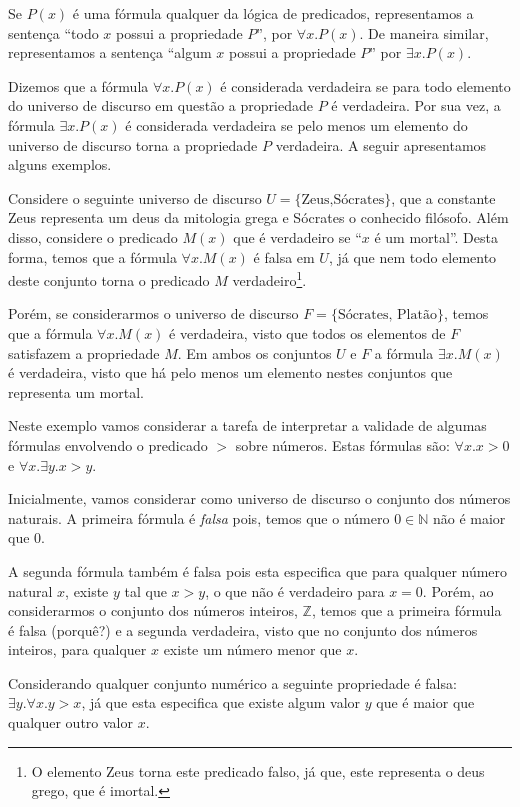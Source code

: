 Se $P(x)$ é uma fórmula qualquer da lógica de predicados,
representamos a sentença ``todo $x$ possui a propriedade $P$'', por
$\forall x.P(x)$. De maneira similar, representamos a sentença ``algum
$x$ possui a propriedade $P$'' por $\exists x.P(x)$.

Dizemos que a fórmula $\forall x.P(x)$ é considerada verdadeira se para todo
elemento do universo de discurso em questão a propriedade $P$ é
verdadeira. Por sua vez, a fórmula $\exists x.P(x)$ é considerada
verdadeira se pelo menos um elemento do universo de discurso torna a
propriedade $P$ verdadeira. A seguir apresentamos alguns exemplos.

\begin{Example}
Considere o seguinte universo de discurso $U = \{\text{Zeus,Sócrates}\}$,
que a constante Zeus representa um deus da mitologia grega e Sócrates
o conhecido filósofo. Além disso, considere o predicado $M(x)$ que é
verdadeiro se ``$x$ é um mortal''. Desta forma, temos que a fórmula
$\forall x. M(x)$ é falsa em $U$, já que nem todo elemento deste
conjunto torna o predicado $M$ verdadeiro\footnote{O elemento Zeus torna
este predicado falso, já que, este representa o deus grego, que é
imortal.}.

Porém, se considerarmos o universo de discurso $F = \{\text{Sócrates, Platão}\}$, temos que
a fórmula $\forall x. M(x)$ é verdadeira, visto que todos os elementos
de $F$ satisfazem a propriedade $M$. Em ambos os conjuntos $U$ e $F$ a
fórmula $\exists x. M(x)$ é verdadeira, visto que há pelo menos um
elemento nestes conjuntos que representa um mortal.
\end{Example}

\begin{Example}
Neste exemplo vamos considerar a tarefa de interpretar a validade de
algumas fórmulas envolvendo o predicado $>$ sobre
números. Estas fórmulas são: $\forall x. x > 0$ e $\forall x. \exists
y. x > y$.

Inicialmente, vamos considerar como universo de discurso o
conjunto dos números naturais. A primeira fórmula é \textit{falsa}
pois, temos que o número $0 \in \mathbb{N}$ não é maior que $0$.

A segunda fórmula também é falsa pois esta especifica que para qualquer número
natural $x$, existe $y$ tal que $x > y$, o que não é verdadeiro para
$x = 0$. Porém, ao considerarmos o conjunto dos números inteiros,
$\mathbb{Z}$, temos que a primeira fórmula é falsa (porquê?) e a
segunda verdadeira, visto que no conjunto dos números inteiros, para
qualquer $x$ existe um número menor que $x$.

Considerando qualquer conjunto numérico a seguinte propriedade é
falsa: $\exists y. \forall x. y > x$, já que esta especifica que
existe algum valor $y$ que é maior que qualquer outro valor $x$.
\end{Example}

